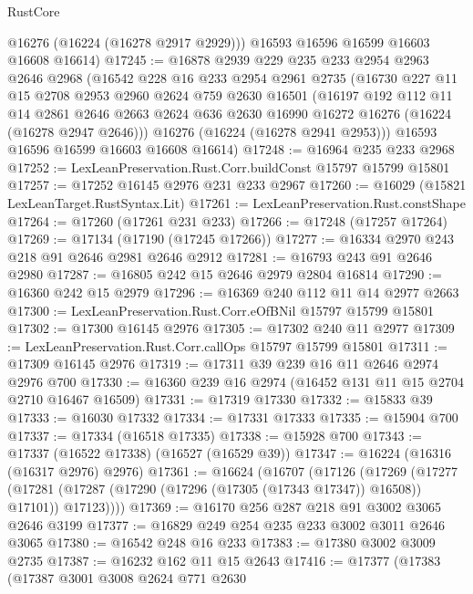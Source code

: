 \begin{lexlean}{RustCore}
\begin{coremodule}
        @16276
        (@16224 (@16278 @2917 @2929)))
      @16593
      @16596
      @16599
      @16603
      @16608
      @16614)
@17245 := @16878
    @2939
    @229
    @235
    @233
    @2954
    @2963
    @2646
    @2968
    (@16542
      @228
      @16
      @233
      @2954
      @2961
      @2735
      (@16730
        @227
        @11
        @15
        @2708
        @2953
        @2960
        @2624
        @759
        @2630
        @16501
        (@16197
          @192
          @112
          @11
          @14
          @2861
          @2646
          @2663
          @2624
          @636
          @2630
          @16990
          @16272
          @16276
          (@16224 (@16278 @2947 @2646)))
        @16276
        (@16224 (@16278 @2941 @2953)))
      @16593
      @16596
      @16599
      @16603
      @16608
      @16614)
@17248 := @16964 @235 @233 @2968
@17252 := LexLeanPreservation.Rust.Corr.buildConst @15797 @15799 @15801
@17257 := @17252 @16145 @2976 @231 @233 @2967
@17260 := @16029 (@15821 LexLeanTarget.RustSyntax.Lit)
@17261 := LexLeanPreservation.Rust.constShape
@17264 := @17260 (@17261 @231 @233)
@17266 := @17248 (@17257 @17264)
@17269 := @17134 (@17190 (@17245 @17266))
@17277 := @16334 @2970 @243 @218 @91 @2646 @2981 @2646 @2912
@17281 := @16793 @243 @91 @2646 @2980
@17287 := @16805 @242 @15 @2646 @2979 @2804 @16814
@17290 := @16360 @242 @15 @2979
@17296 := @16369 @240 @112 @11 @14 @2977 @2663
@17300 := LexLeanPreservation.Rust.Corr.eOfBNil @15797 @15799 @15801
@17302 := @17300 @16145 @2976
@17305 := @17302 @240 @11 @2977
@17309 := LexLeanPreservation.Rust.Corr.callOps @15797 @15799 @15801
@17311 := @17309 @16145 @2976
@17319 := @17311 @39 @239 @16 @11 @2646 @2974 @2976 @700
@17330 := @16360 @239 @16 @2974 (@16452 @131 @11 @15 @2704 @2710 @16467 @16509)
@17331 := @17319 @17330
@17332 := @15833 @39
@17333 := @16030 @17332
@17334 := @17331 @17333
@17335 := @15904 @700
@17337 := @17334 (@16518 @17335)
@17338 := @15928 @700
@17343 := @17337 (@16522 @17338) (@16527 (@16529 @39))
@17347 := @16224 (@16316 (@16317 @2976) @2976)
@17361 := @16624
    (@16707
      (@17126
        (@17269
          (@17277
            (@17281 (@17287 (@17290 (@17296 (@17305 (@17343 @17347)) @16508)) @17101))
            @17123))))
@17369 := @16170 @256 @287 @218 @91 @3002 @3065 @2646 @3199
@17377 := @16829 @249 @254 @235 @233 @3002 @3011 @2646 @3065
@17380 := @16542 @248 @16 @233
@17383 := @17380 @3002 @3009 @2735
@17387 := @16232 @162 @11 @15 @2643
@17416 := @17377
    (@17383
      (@17387
        @3001
        @3008
        @2624
        @771
        @2630

\end{coremodule}
\end{lexlean}
